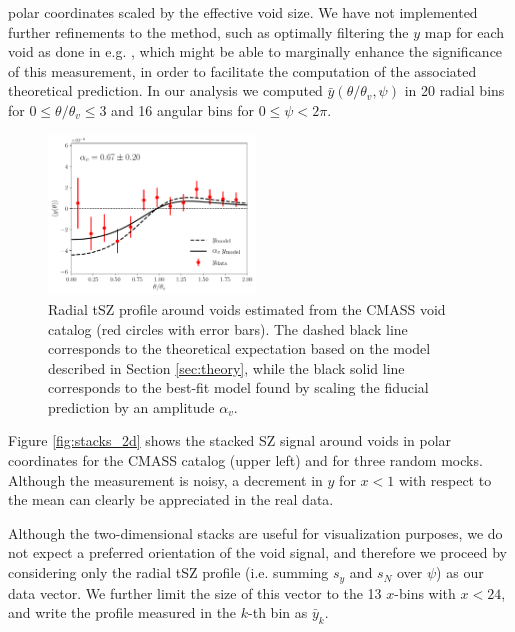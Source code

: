 \documentclass[twocolumn,amsfont,amssymb,amsmath, showpacs,balancelastpage, nofootinbib]{revtex4-1}
\begin{document}
      polar coordinates scaled by the effective void size. We have not implemented further
      refinements to the method, such as optimally filtering the $y$ map for each void as
      done in e.g. \cite{2017MNRAS.466.3364C}, which might be able to marginally enhance the
      significance of this measurement, in order to facilitate the computation of the associated
      theoretical prediction. In our analysis we computed $\bar{y}(\theta/\theta_v,\psi)$ in
      20 radial bins for $0\leq\theta/\theta_v\leq3$ and 16 angular bins for $0\leq\psi<2\pi$.
      \begin{figure}
        \centering
        \includegraphics[width=0.49\textwidth]{y_result}
        \caption{Radial tSZ profile around voids estimated from the CMASS void catalog
                 (red circles with error bars). The dashed black line corresponds to
                 the theoretical expectation based on the model described in Section
                 \ref{sec:theory}, while the black solid line corresponds to the
                 best-fit model found by scaling the fiducial prediction by an
                 amplitude $\alpha_v$.}
        \label{fig:y_result}
      \end{figure}
      
      Figure \ref{fig:stacks_2d} shows the stacked SZ signal around voids in polar coordinates
      for the CMASS catalog (upper left) and for three random mocks. Although the measurement
      is noisy, a decrement in $y$ for $x<1$ with respect to the mean can clearly be appreciated
      in the real data.
      
      Although the two-dimensional stacks are useful for visualization purposes, we do not 
      expect a preferred orientation of the void signal, and therefore we proceed by
      considering only the radial tSZ profile (i.e. summing $s_y$ and $s_N$ over $\psi$)
      as our data vector. We further limit the size of this vector to the 13 $x$-bins with
      $x<24$, and write the profile measured in the $k$-th bin as $\bar{y}_k$.
      
\end{document}

